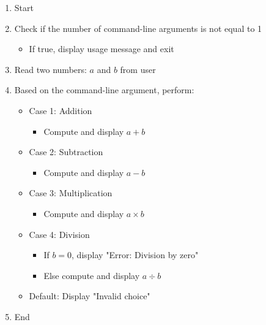 \begin{enumerate}
    \item Start
    \item Check if the number of command-line arguments is not equal to 1
    \begin{itemize}
        \item If true, display usage message and exit
    \end{itemize}
    \item Read two numbers: $a$ and $b$ from user
    \item Based on the command-line argument, perform:
    \begin{itemize}
        \item Case 1: Addition
        \begin{itemize}
            \item Compute and display $a + b$
        \end{itemize}
        \item Case 2: Subtraction
        \begin{itemize}
            \item Compute and display $a - b$
        \end{itemize}
        \item Case 3: Multiplication
        \begin{itemize}
            \item Compute and display $a \times b$
        \end{itemize}
        \item Case 4: Division
        \begin{itemize}
            \item If $b = 0$, display "Error: Division by zero"
            \item Else compute and display $a \div b$
        \end{itemize}
        \item Default: Display "Invalid choice"
    \end{itemize}
    \item End
\end{enumerate}

